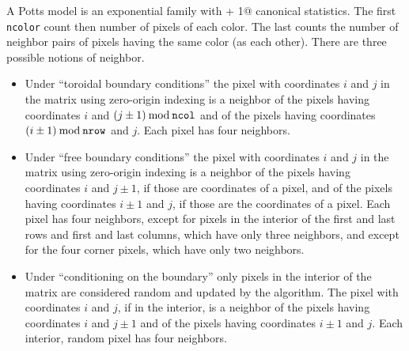 \documentclass[11pt]{article}
\renewcommand{\mod}{\mathbin{\rm mod}}
\begin{document}
A Potts model is an exponential family with \verb@ncolor + 1@ canonical
statistics.  The first \texttt{ncolor} count then number of pixels of each
color.  The last counts the number of neighbor pairs of pixels having the
same color (as each other).  There are three possible notions of neighbor.
\begin{itemize}
\item Under ``toroidal boundary conditions'' the pixel
with coordinates $i$ and $j$
in the matrix using zero-origin indexing is a neighbor of the pixels having
coordinates $i$ and $(j \pm 1) \mod \texttt{ncol}$ and of the pixels having
coordinates $(i \pm 1) \mod \texttt{nrow}$ and $j$.  Each pixel has four
neighbors.
\item Under ``free boundary conditions'' the pixel
with coordinates $i$ and $j$
in the matrix using zero-origin indexing is a neighbor of the pixels having
coordinates $i$ and $j \pm 1$, if those are coordinates of a pixel,
and of the pixels having coordinates $i \pm 1$ and $j$, if those are the
coordinates of a pixel.  Each pixel has four neighbors, except for pixels
in the interior of the first and last rows and first and last columns,
which have only three neighbors, and except for the four corner pixels,
which have only two neighbors.
\item Under ``conditioning on the boundary'' only pixels in the interior
of the matrix are considered random and updated by the algorithm.  The
pixel with coordinates $i$ and $j$, if in the interior,
is a neighbor of the pixels having
coordinates $i$ and $j \pm 1$ and of the pixels having coordinates
$i \pm 1$ and $j$.  Each interior, random pixel has four neighbors.
\end{itemize}
\end{document}

